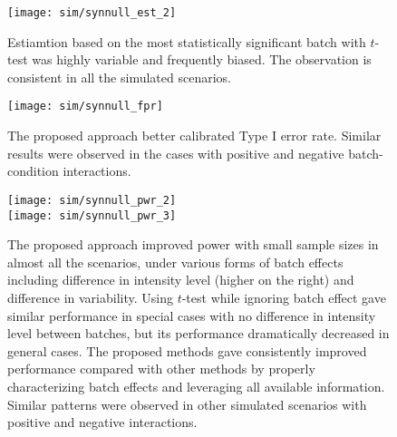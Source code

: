 \documentclass{mcp}
\begin{document}
\begin{figure}[h!]
\centering
\texttt{[image: sim/synnull\_est\_2]}
\caption{Estiamtion based on the most statistically significant batch with $t$-test was highly variable and frequently biased. The observation is consistent in all the simulated scenarios. \label{fig:synnull_est}}
\end{figure}

\begin{figure}[h!]
\centering
\texttt{[image: sim/synnull\_fpr]}
\caption{The proposed approach better calibrated Type I error rate. Similar results were observed in the cases with positive and negative batch-condition interactions. \label{fig:synnull_fpr}}
\end{figure}

\clearpage
\begin{figure}[h!]
\centering
\texttt{[image: sim/synnull\_pwr\_2]}\\
\texttt{[image: sim/synnull\_pwr\_3]}
\caption{The proposed approach improved power with small sample sizes in almost all the scenarios, under various forms of batch effects including difference in intensity level (higher on the right) and difference in variability. Using $t$-test while ignoring batch effect gave similar performance in special cases with no difference in intensity level between batches, but its performance dramatically decreased in general cases. The proposed methods gave consistently improved performance compared with other methods by properly characterizing batch effects and leveraging all available information. Similar patterns were observed in other simulated scenarios with positive and negative interactions.\label{fig:synnull_pwr}}
\end{figure}

\end{document}

